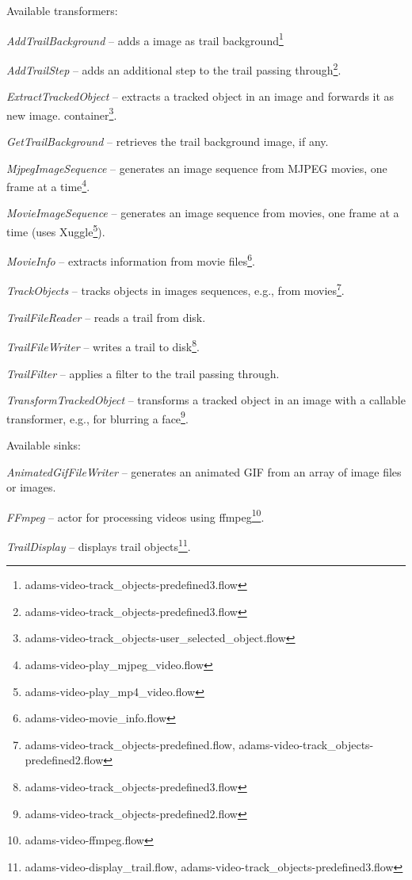 \documentclass[a4paper]{book}
\begin{document}
\noindent Available transformers:
\begin{tight_itemize}
	\item \textit{AddTrailBackground} -- adds a image as trail
	background\footnote{adams-video-track\_objects-predefined3.flow}
	\item \textit{AddTrailStep} -- adds an additional step to the trail
	passing through\footnote{adams-video-track\_objects-predefined3.flow}.
	\item \textit{ExtractTrackedObject} -- extracts a tracked
	object in an image and forwards it as new image.
	container\footnote{adams-video-track\_objects-user\_selected\_object.flow}.
	\item \textit{GetTrailBackground} -- retrieves the trail background image, if any.
	\item \textit{MjpegImageSequence} -- generates an image sequence
	from MJPEG movies, one frame at a time\footnote{adams-video-play\_mjpeg\_video.flow}.
	\item \textit{MovieImageSequence} -- generates an image sequence
	from movies, one frame at a time (uses Xuggle\cite{xuggle}\footnote{adams-video-play\_mp4\_video.flow}).
	\item \textit{MovieInfo} -- extracts information from movie files\footnote{adams-video-movie\_info.flow}.
	\item \textit{TrackObjects} -- tracks objects in images sequences,
	e.g., from movies\footnote{adams-video-track\_objects-predefined.flow, adams-video-track\_objects-predefined2.flow}.
	\item \textit{TrailFileReader} -- reads a trail from disk.
	\item \textit{TrailFileWriter} -- writes a trail to disk\footnote{adams-video-track\_objects-predefined3.flow}.
	\item \textit{TrailFilter} -- applies a filter to the trail passing through.
	\item \textit{TransformTrackedObject} -- transforms a tracked
	object in an image with a callable transformer, e.g., for blurring a
	face\footnote{adams-video-track\_objects-predefined2.flow}.
\end{tight_itemize}

\noindent Available sinks:
\begin{tight_itemize}
  \item \textit{AnimatedGifFileWriter} -- generates an animated GIF from
  an array of image files or images.
  \item \textit{FFmpeg} -- actor for processing videos using
  ffmpeg\cite{ffmpeg}\footnote{adams-video-ffmpeg.flow}.
  \item \textit{TrailDisplay} -- displays trail objects\footnote{adams-video-display\_trail.flow, adams-video-track\_objects-predefined3.flow}.
\end{tight_itemize}
\end{document}
